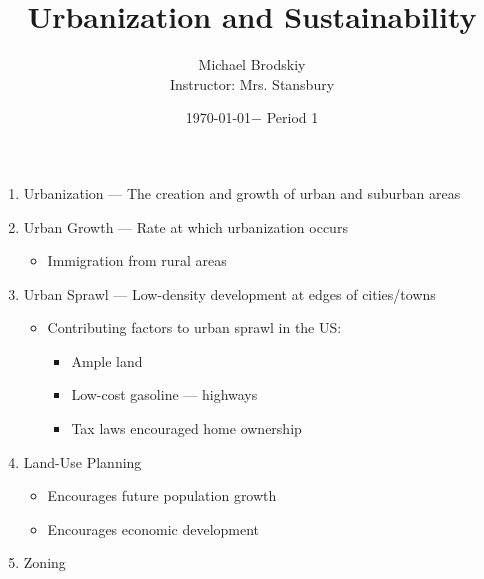 \documentclass[12pt]{article}
\title{Urbanization and Sustainability}
\date{\today $-$ Period 1}
\author{Michael Brodskiy\\ \small Instructor: Mrs. Stansbury}
\begin{document}
\maketitle

\begin{enumerate}


  \item Urbanization — The creation and growth of urban and suburban areas

  \item Urban Growth — Rate at which urbanization occurs

    \begin{itemize}

      \item Immigration from rural areas

    \end{itemize}

  \item Urban Sprawl — Low-density development at edges of cities/towns

    \begin{itemize}

      \item Contributing factors to urban sprawl in the US:

        \begin{itemize}

          \item Ample land

          \item Low-cost gasoline — highways

          \item Tax laws encouraged home ownership

        \end{itemize}

    \end{itemize}

  \item Land-Use Planning

    \begin{itemize}

      \item Encourages future population growth

      \item Encourages economic development

    \end{itemize}

  \item Zoning


\end{enumerate}
\end{document}
